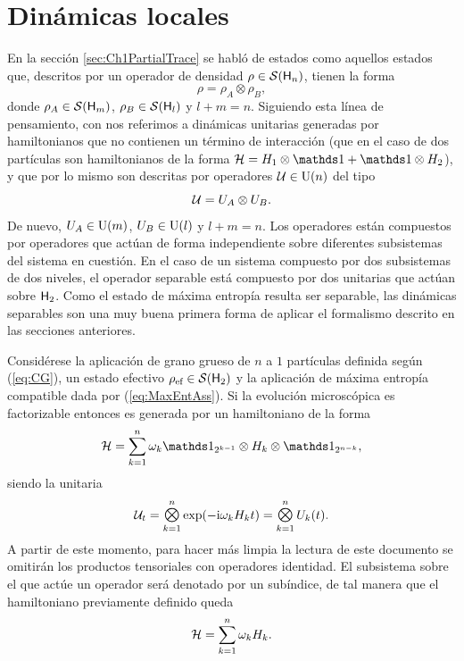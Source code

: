 \section{Dinámicas locales}

En la sección \ref{sec:Ch1PartialTrace} se habló de estados  como aquellos estados que, descritos por un operador de densidad $\rho\in\mathcal{S}({\sf H}_{n})$, tienen la forma
\begin{equation}
    \rho=\rho_{A}\otimes\rho_{B},\nonumber
\end{equation}
donde $\rho_{A}\in\mathcal{S}({\sf H}_{m})$, $\rho_{B}\in\mathcal{S}({\sf H}_{l})$ y $l+m=n$. Siguiendo esta línea de pensamiento, con  nos referimos a dinámicas unitarias generadas por hamiltonianos que no contienen un término de interacción (que en el caso de dos partículas son hamiltonianos de la forma $\mcH=H_{1}\otimes\Id+\Id\otimes H_{2}$), y que por lo mismo son descritas por operadores $\mathcal{U}\in\text{U}(n)$  del tipo
\begin{equation}
    \mathcal{U}=U_{A}\otimes U_{B}.\nonumber
\end{equation}
De nuevo, $U_{A}\in\text{U}(m)$, $U_{B}\in\text{U}(l)$ y $l+m=n$. Los operadores   están compuestos por operadores que actúan de forma independiente sobre diferentes subsistemas del sistema en cuestión. En el caso de un sistema compuesto por dos subsistemas de dos niveles, el operador separable está compuesto por dos unitarias que actúan sobre ${\sf H}_{2}$. Como el estado de máxima entropía resulta ser separable, las dinámicas separables son una muy buena primera forma de aplicar el formalismo descrito en las secciones anteriores.

Considérese la aplicación de grano grueso de $n$ a $1$ partículas definida según (\ref{eq:CG}), un estado efectivo $\rho_{\text{ef}}\in\mathcal{S}({\sf H}_{2})$ y la aplicación de máxima entropía compatible dada por (\ref{eq:MaxEntAss}). Si la evolución microscópica es factorizable entonces es generada por un hamiltoniano de la forma
\begin{equation}
    \mcH=\sum_{k=1}^{n}\omega_{k}\Id_{2^{k-1}}\otimes H_{k} \otimes \Id_{2^{n-k}},\nonumber
\end{equation}
siendo la unitaria 
\begin{equation}\label{eq:NFactorUnitaries}
    \mcU_{t}=\Motimes_{k=1}^{n}\text{exp}\qty(-\rmi\omega_{k}H_{k}t)=\Motimes_{k=1}^{n} U_{k}(t).
\end{equation}
A partir de este momento, para hacer más limpia la lectura de este documento se omitirán los productos tensoriales con operadores identidad. El subsistema sobre el que actúe un operador será denotado por un subíndice, de tal manera que el hamiltoniano previamente definido queda
\begin{equation}
    \mathcal{H}=\sum_{k=1}^{n}\omega_{k}H_{k}.\nonumber
\end{equation}


